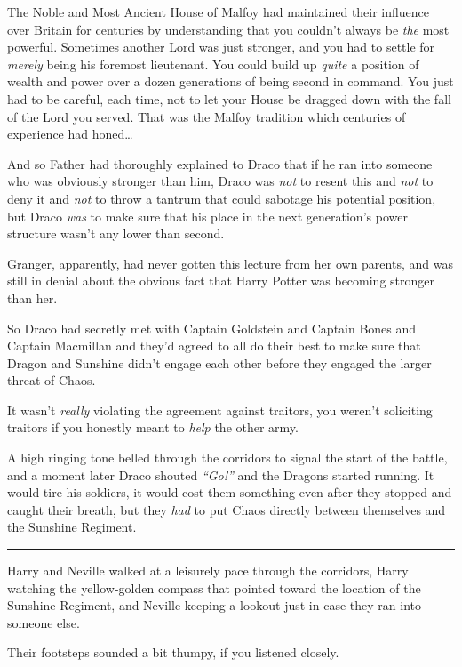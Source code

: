The Noble and Most Ancient House of Malfoy had maintained their
influence over Britain for centuries by understanding that you couldn't
always be \emph{the} most powerful. Sometimes another Lord was just
stronger, and you had to settle for \emph{merely} being his foremost
lieutenant. You could build up \emph{quite} a position of wealth and
power over a dozen generations of being second in command. You just had
to be careful, each time, not to let your House be dragged down with the
fall of the Lord you served. That was the Malfoy tradition which
centuries of experience had honed\ldots{}

And so Father had thoroughly explained to Draco that if he ran into
someone who was obviously stronger than him, Draco was \emph{not} to
resent this and \emph{not} to deny it and \emph{not} to throw a tantrum
that could sabotage his potential position, but Draco \emph{was} to make
sure that his place in the next generation's power structure wasn't any
lower than second.

Granger, apparently, had never gotten this lecture from her own parents,
and was still in denial about the obvious fact that Harry Potter was
becoming stronger than her.

So Draco had secretly met with Captain Goldstein and Captain Bones and
Captain Macmillan and they'd agreed to all do their best to make sure
that Dragon and Sunshine didn't engage each other before they engaged
the larger threat of Chaos.

It wasn't \emph{really} violating the agreement against traitors, you
weren't soliciting traitors if you honestly meant to \emph{help} the
other army.

A high ringing tone belled through the corridors to signal the start of
the battle, and a moment later Draco shouted \emph{``Go!''} and the
Dragons started running. It would tire his soldiers, it would cost them
something even after they stopped and caught their breath, but they
\emph{had} to put Chaos directly between themselves and the Sunshine
Regiment.

\begin{center}\rule{3in}{0.4pt}\end{center}

Harry and Neville walked at a leisurely pace through the corridors,
Harry watching the yellow-golden compass that pointed toward the
location of the Sunshine Regiment, and Neville keeping a lookout just in
case they ran into someone else.

Their footsteps sounded a bit thumpy, if you listened closely.

